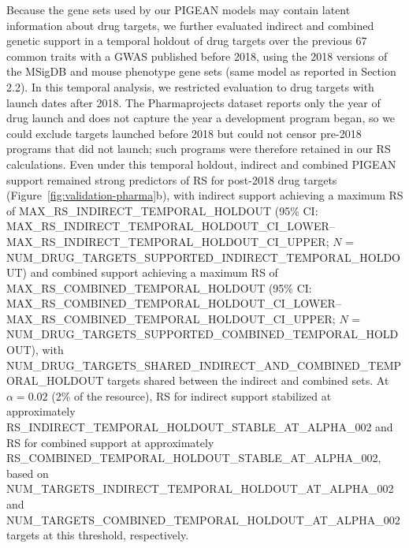 Because the gene sets used by our PIGEAN models may contain latent information about drug targets, we further evaluated indirect and combined genetic support in a temporal holdout of drug targets over the previous 67 common traits with a GWAS published before 2018, using the 2018 versions of the MSigDB and mouse phenotype gene sets (same model as reported in Section 2.2). In this temporal analysis, we restricted evaluation to drug targets with launch dates after 2018. The Pharmaprojects dataset reports only the year of drug launch \cite{minikel_refining_2024} and does not capture the year a development program began, so we could exclude targets launched before 2018 but could not censor pre-2018 programs that did not launch; such programs were therefore retained in our RS calculations. Even under this temporal holdout, indirect and combined PIGEAN support remained strong predictors of RS for post-2018 drug targets (Figure~\ref{fig:validation-pharma}b), with indirect support achieving a maximum RS of {{MAX_RS_INDIRECT_TEMPORAL_HOLDOUT}} (95\% CI: {{MAX_RS_INDIRECT_TEMPORAL_HOLDOUT_CI_LOWER}}--{{MAX_RS_INDIRECT_TEMPORAL_HOLDOUT_CI_UPPER}}; $N$ = {{NUM_DRUG_TARGETS_SUPPORTED_INDIRECT_TEMPORAL_HOLDOUT}}) and combined support achieving a maximum RS of {{MAX_RS_COMBINED_TEMPORAL_HOLDOUT}} (95\% CI: {{MAX_RS_COMBINED_TEMPORAL_HOLDOUT_CI_LOWER}}--{{MAX_RS_COMBINED_TEMPORAL_HOLDOUT_CI_UPPER}}; $N$ = {{NUM_DRUG_TARGETS_SUPPORTED_COMBINED_TEMPORAL_HOLDOUT}}), with {{NUM_DRUG_TARGETS_SHARED_INDIRECT_AND_COMBINED_TEMPORAL_HOLDOUT}} targets shared between the indirect and combined sets. At $\alpha = 0.02$ (2\% of the resource), RS for indirect support stabilized at approximately {{RS_INDIRECT_TEMPORAL_HOLDOUT_STABLE_AT_ALPHA_002}} and RS for combined support at approximately {{RS_COMBINED_TEMPORAL_HOLDOUT_STABLE_AT_ALPHA_002}}, based on {{NUM_TARGETS_INDIRECT_TEMPORAL_HOLDOUT_AT_ALPHA_002}} and {{NUM_TARGETS_COMBINED_TEMPORAL_HOLDOUT_AT_ALPHA_002}} targets at this threshold, respectively.


